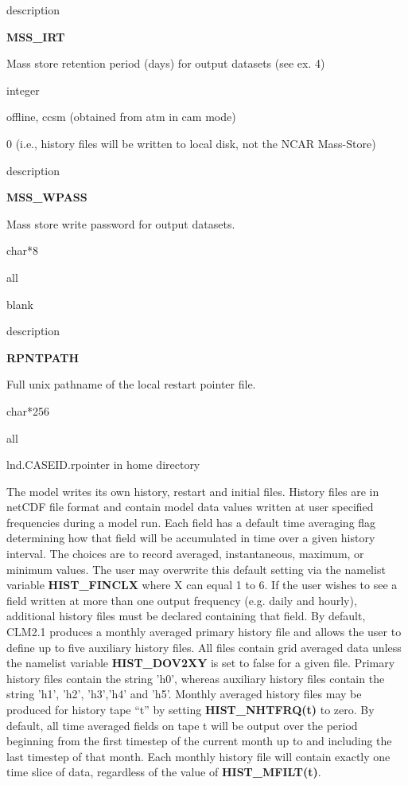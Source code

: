 \begin{Ventry}{description}
 \item[{\bf name}] {\bf MSS\_IRT}   
 \item[description] 
	Mass store retention period (days) for output datasets (see ex. 4) 
 \item[type] integer    
 \item[mode] offline, ccsm (obtained from atm in cam mode)  
 \item[default] 0 (i.e., history files will be written to local disk, 
	not the NCAR Mass-Store) 
\end{Ventry}
\medskip

\begin{Ventry}{description}
 \item[{\bf name}] {\bf MSS\_WPASS}   
 \item[description] 
	Mass store write password for output datasets.
 \item[type] char*8     
 \item[mode] all      
 \item[default] blank  
\end{Ventry}
\medskip

\begin{Ventry}{description}
 \item[{\bf name}] {\bf RPNTPATH}   
 \item[description] 
	Full unix pathname of the local restart pointer file. 
 \item[type] char*256              
 \item[mode] all       
 \item[default] lnd.CASEID.rpointer in home directory   
\end{Ventry}
\bigskip

The model writes its own history, restart and initial files. History
files are in netCDF file format and contain model data values written
at user specified frequencies during a model run.  Each field has a
default time averaging flag determining how that field will be
accumulated in time over a given history interval.  The choices are to
record averaged, instantaneous, maximum, or minimum values.  The user
may overwrite this default setting via the namelist variable {\bf
HIST\_FINCLX} where X can equal 1 to 6.  If the user wishes to see a
field written at more than one output frequency (e.g. daily and
hourly), additional history files must be declared containing that
field.  By default, CLM2.1 produces a monthly averaged primary history
file and allows the user to define up to five auxiliary history files.
All files contain grid averaged data unless the namelist variable {\bf
HIST\_DOV2XY} is set to false for a given file.  Primary history files
contain the string 'h0', whereas auxiliary history files contain the
string 'h1', 'h2', 'h3','h4' and 'h5'.  Monthly averaged history files
may be produced for history tape ``t'' by setting {\bf
HIST\_NHTFRQ(t)} to zero.  By default, all time averaged fields on
tape t will be output over the period beginning from the first
timestep of the current month up to and including the last timestep of
that month. Each monthly history file will contain exactly one time
slice of data, regardless of the value of {\bf HIST\_MFILT(t)}.

